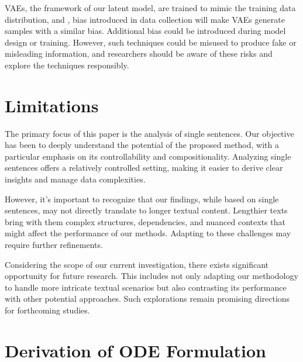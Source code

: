 \documentclass[11pt]{article}
\begin{document}
VAEs, the framework of our latent model, are trained to mimic the training data distribution, and , bias introduced in data collection will make VAEs generate samples with a similar bias. Additional bias could be introduced during model design or training. However, such techniques could be misused to produce fake or misleading information, and researchers should be aware of these risks and explore the techniques responsibly.
\section*{Limitations}
The primary focus of this paper is the analysis of single sentences. Our objective has been to deeply understand the potential of the proposed method, with a particular emphasis on its controllability and compositionality. Analyzing single sentences offers a relatively controlled setting, making it easier to derive clear insights and manage data complexities.

However, it's important to recognize that our findings, while based on single sentences, may not directly translate to longer textual content. Lengthier texts bring with them complex structures, dependencies, and nuanced contexts that might affect the performance of our methods. Adapting to these challenges may require further refinements.



Considering the scope of our current investigation, there exists significant opportunity for future research. This includes not only adapting our methodology to handle more intricate textual scenarios but also contrasting its performance with other potential approaches. Such explorations remain promising directions for forthcoming studies.
%
 



\clearpage
\appendix

\onecolumn
\section{Derivation of ODE Formulation}
\label{app:derivation_ode}
\newcommand{\td}{\text d}
\newcommand{\gxt}{\bm{G}(\bm{x},t)}
\newcommand{\bmx}{\bm x}
\newcommand{\fxt}{\bm f(\bm x,t)}
\newcommand{\barw}{\Bar{\bm w}}
\end{document}
